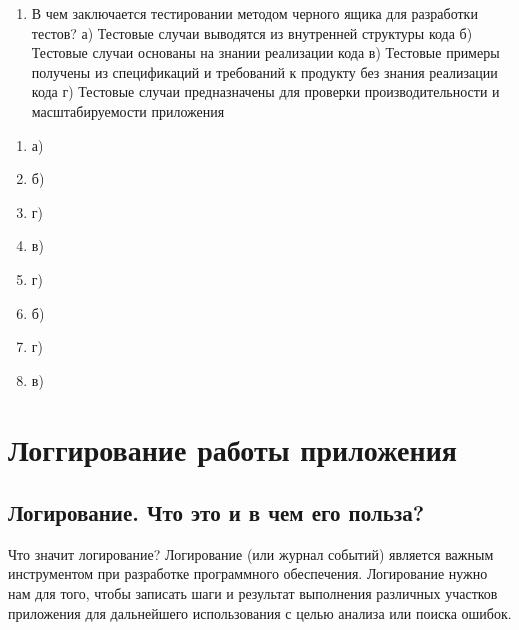 \documentclass[letterpaper,10pt,russian]{sphinxmanual}
\begin{document}
\begin{enumerate}
\item {} 
\sphinxAtStartPar
В чем заключается тестировании методом черного ящика для разработки тестов?
а) Тестовые случаи выводятся из внутренней структуры кода
б) Тестовые случаи основаны на знании реализации кода
в) Тестовые примеры получены из спецификаций и требований к продукту без знания реализации кода
г) Тестовые случаи предназначены для проверки производительности и масштабируемости приложения

\end{enumerate}

\sphinxAtStartPar
{}
\begin{enumerate}
%
\item {} 
\sphinxAtStartPar
а)

\item {} 
\sphinxAtStartPar
б)

\item {} 
\sphinxAtStartPar
г)

\item {} 
\sphinxAtStartPar
в)

\item {} 
\sphinxAtStartPar
г)

\item {} 
\sphinxAtStartPar
б)

\item {} 
\sphinxAtStartPar
г)

\item {} 
\sphinxAtStartPar
в)

\end{enumerate}


\chapter{Логгирование работы приложения}
\label{\detokenize{index:id15}}
\sphinxstepscope


\section{Логирование. Что это и в чем его польза?}
\label{\detokenize{educational_materials/logging/content:id1}}\label{\detokenize{educational_materials/logging/content::doc}}
\sphinxAtStartPar
Что значит логирование? Логирование (или журнал событий) является важным инструментом при разработке программного обеспечения. Логирование нужно нам для того, чтобы записать шаги и результат выполнения различных участков приложения для дальнейшего использования с целью анализа или поиска ошибок.
\end{document}
